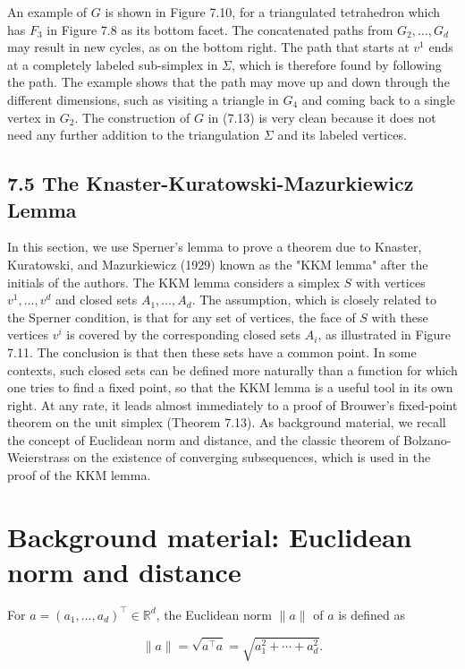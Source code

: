 \documentclass[12pt]{article}
\begin{document}
An example of $G$ is shown in Figure 7.10, for a triangulated tetrahedron which has $F_{3}$ in Figure 7.8 as its bottom facet. The concatenated paths from $G_{2}, \ldots, G_{d}$ may result in new cycles, as on the bottom right. The path that starts at $v^{1}$ ends at a completely labeled sub-simplex in $\Sigma$, which is therefore found by following\\
the path. The example shows that the path may move up and down through the different dimensions, such as visiting a triangle in $G_{4}$ and coming back to a single vertex in $G_{2}$. The construction of $G$ in (7.13) is very clean because it does not need any further addition to the triangulation $\Sigma$ and its labeled vertices.

\subsection*{7.5 The Knaster-Kuratowski-Mazurkiewicz Lemma}
In this section, we use Sperner's lemma to prove a theorem due to Knaster, Kuratowski, and Mazurkiewicz (1929) known as the "KKM lemma" after the initials of the authors. The KKM lemma considers a simplex $S$ with vertices $v^{1}, \ldots, v^{d}$ and closed sets $A_{1}, \ldots, A_{d}$. The assumption, which is closely related to the Sperner condition, is that for any set of vertices, the face of $S$ with these vertices $v^{i}$ is covered by the corresponding closed sets $A_{i}$, as illustrated in Figure 7.11. The conclusion is that then these sets have a common point. In some contexts, such closed sets can be defined more naturally than a function for which one tries to find a fixed point, so that the KKM lemma is a useful tool in its own right. At any rate, it leads almost immediately to a proof of Brouwer's fixed-point theorem on the unit simplex (Theorem 7.13). As background material, we recall the concept of Euclidean norm and distance, and the classic theorem of Bolzano-Weierstrass on the existence of converging subsequences, which is used in the proof of the KKM lemma.

\section*{Background material: Euclidean norm and distance}
For $a=\left(a_{1}, \ldots, a_{d}\right)^{\top} \in \mathbb{R}^{d}$, the Euclidean norm $\|a\|$ of $a$ is defined as

$$
\|a\|=\sqrt{a^{\top} a}=\sqrt{a_{1}^{2}+\cdots+a_{d}^{2}} .
$$
\end{document}
